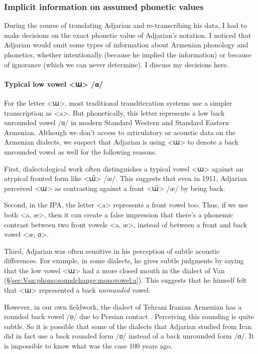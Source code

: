 \subsubsection{Implicit information on assumed phonetic values}\label{sec:HossepIntro:phonotransc:adj:implicit}
During the course of translating Adjarian and re-transcribing his data, I had to make decisions on the exact phonetic value of Adjarian's notation. I noticed that Adjarian would omit some types of information about Armenian phonology and phonetics, whether intentionally (because he implied the information) or because of ignorance (which we can never determine). I discuss my decisions here. 
\paragraph{Typical low vowel <ա> /ɑ/}

For the letter <ա>, most traditional transliteration systems use a simpler transcription as <a>. But phonetically, this letter represents a low back unrounded vowel /ɑ/ in modern Standard Western and Standard Eastern Armenian. Although we don't access to articulatory or acoustic data on the Armenian dialects, we suspect that Adjarian is using <ա> to denote a back unrounded vowel as well for the following reasons. 


First, dialectological work often distinguishes a typical vowel <ա> against an atypical fronted form like <ա̈> /æ/. This suggests that even in 1911, Adjarian perceived <ա> as contrasting against a front <ա̈> /æ/ by being back. 

Second, in the IPA, the letter <a> represents a front vowel too. Thus, if we use both <a, æ>, then it can create a false impression that there's a phonemic contrast between two front vowels <a, æ>, instead of between a front and back vowel <æ, ɑ>. 

Third, Adjarian was often sensitive in his perception of subtle acoustic differences. For example, in some dialects, he gives subtle judgments by saying that the low vowel <ա> had a more closed mouth in the dialect of Van (\S\ref{sec:Van:phono:soundchange:monovowel:a}). This suggests that he himself felt that <ա> represented a back \textit{unrounded} vowel. 

However, in our own fieldwork, the dialect of Tehrani Iranian Armenian has a rounded back vowel /ɒ/ due to Persian contact \citep{DolatianEtAl-prep-IranianGrammar}. Perceiving this rounding is quite subtle. So it is possible that some of the dialects that Adjarian studied from Iran did in fact use a back rounded form /ɒ/ instead of a back unrounded form /ɑ/. It is impossible to know what was the case 100 years ago.

